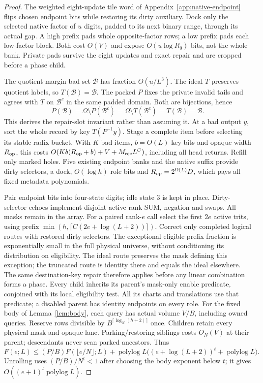 \documentclass[11pt]{article}
\newcommand{\Oh}{O}
\begin{document}
\begin{proof}
The weighted eight-update tile word of Appendix~\ref{app:native-endpoint}
flips chosen endpoint bits while restoring its dirty auxiliary. Dock
only the selected native factor of $u$ digits, padded to its next binary
range, through its actual gap. A high prefix pads whole opposite-factor
rows; a low prefix pads each low-factor block. Both cost $\Oh(V)$ and
expose $\Oh(u\log R_0)$ bits, not the whole bank. Private pads survive
the eight updates and exact repair and are cropped before a phase child.

The quotient-margin bad set $\mathcal B$ has fraction $\Oh(u/L^3)$.
The ideal $T$ preserves quotient labels, so $T(\mathcal B)=\mathcal B$.
The packed $P$ fixes the private invalid tails and agrees with $T$ on
$\mathcal B^c$ in the same padded domain. Both are bijections, hence
\[P(\mathcal B)=\Omega\setminus P(\mathcal B^c)
=\Omega\setminus T(\mathcal B^c)=T(\mathcal B)=\mathcal B.\]
This derives the repair-slot invariant rather than assuming it. At a bad output
$y$, sort the whole record by key $T(P^{-1}y)$. Stage a complete item
before selecting its stable radix bucket. With $K$ bad items, $b=\Oh(L)$
key bits and opaque width $R_{\rm op}$, this costs
$\Oh(Kb(R_{\rm op}+b)+V+M_{\rm rec}L^C)$, including all head returns.
Refill only marked holes. Five existing endpoint banks and the native
suffix provide dirty selectors, a dock, $\Oh(\log h)$ role bits and
$R_{\rm op}=2^{\Omega(L)}D$, which pays all fixed metadata polynomials.

Pair endpoint bits into four-state digits; idle state 3 is kept in place.
Dirty-selector echoes implement disjoint active-rank SUM, negation and
swaps. All masks remain in the array. For a paired rank-$e$ call select
the first $2e$ active trits, using prefix
$\min(h,\lceil C(2e+\log(L+2))\rceil)$. Correct only completed logical
routes with restored dirty selectors. The exceptional eligible prefix
fraction is exponentially small in the full physical universe, without
conditioning its distribution on eligibility. The ideal route preserves
the mask defining this exception; the truncated route is identity there
and equals the ideal elsewhere. The same destination-key repair therefore
applies before any linear combination forms a phase.
Every child inherits its parent's mask-only enable predicate, conjoined
with its local eligibility test. All its charts and translations use
that predicate; a disabled parent has identity endpoints on every role.
For the fixed body of Lemma~\ref{lem:body}, each query has actual volume
$V/B$, including owned queries. Reserve rows divisible by
$B^{\lceil\log_N(h+2)\rceil}$ once. Children retain every physical mask
and opaque lane. Parking/restoring siblings costs $\Oh_N(V)$ at their
parent; descendants never scan parked ancestors. Thus
\[F(e;L)\le(P/B)F(\lfloor e/N\rfloor;L)
+\operatorname{polylog}L\bigl((e+\log(L+2))^t+\operatorname{polylog}L\bigr).
\]
Unrolling uses $(P/B)/N^t<1$ after choosing the body exponent below $t$;
it gives $\Oh((e+1)^t\operatorname{polylog}L)$.


\end{proof}
\end{document}

